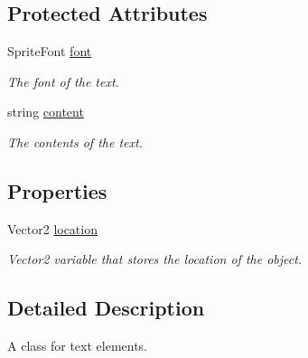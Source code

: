 \subsection*{Protected Attributes}
\begin{DoxyCompactItemize}
\item 
\hypertarget{classwp__engine_1_1_text_ac86929184c1426972dc3f0cdb768b3dc}{Sprite\-Font \hyperlink{classwp__engine_1_1_text_ac86929184c1426972dc3f0cdb768b3dc}{font}}\label{classwp__engine_1_1_text_ac86929184c1426972dc3f0cdb768b3dc}

\begin{DoxyCompactList}\small\item\em The font of the text. \end{DoxyCompactList}\item 
\hypertarget{classwp__engine_1_1_text_af48a92c9e88bc3c187ca8d807aa74cdd}{string \hyperlink{classwp__engine_1_1_text_af48a92c9e88bc3c187ca8d807aa74cdd}{content}}\label{classwp__engine_1_1_text_af48a92c9e88bc3c187ca8d807aa74cdd}

\begin{DoxyCompactList}\small\item\em The contents of the text. \end{DoxyCompactList}\end{DoxyCompactItemize}
\subsection*{Properties}
\begin{DoxyCompactItemize}
\item 
\hypertarget{classwp__engine_1_1_text_afdb55db0e26301ae2d0a7b049fc4c978}{Vector2 \hyperlink{classwp__engine_1_1_text_afdb55db0e26301ae2d0a7b049fc4c978}{location}}\label{classwp__engine_1_1_text_afdb55db0e26301ae2d0a7b049fc4c978}

\begin{DoxyCompactList}\small\item\em Vector2 variable that stores the location of the object. \end{DoxyCompactList}\end{DoxyCompactItemize}


\subsection{Detailed Description}
A class for text elements. 

